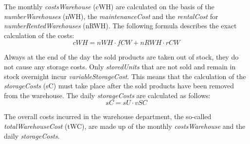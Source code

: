 The monthly \textit{costsWarehouse} (\gls{cWH}) are calculated on the basis of the \textit{numberWarehouses} (\gls{nWH}), the \textit{maintenanceCost} and the \textit{rentalCost} for \textit{numberRentedWarehouses} (\gls{nRWH}). The following formula describes the exact calculation of the costs:
\begin{equation}
\label{func:cWH} %
     cWH = nWH \cdot fCW + nRWH \cdot rCW
\end{equation}

Always at the end of the day the sold products are taken out of stock, they do not cause any storage costs. Only \textit{storedUnits} that are not sold and remain in stock overnight incur \textit{variableStorageCost}. This means that the calculation of the \textit{storageCosts} (\gls{sC}) must take place after the sold products have been removed from the warehouse. The daily \textit{storageCosts} are calculated as follows:
\begin{equation}
\label{func:SC} %
    sC = sU \cdot vSC
\end{equation}

The overall costs incurred in the warehouse department, the so-called \textit{totalWarehouseCost} (\gls{tWC}), are made up of the monthly \textit{costsWarehouse} and the daily \textit{storageCosts}. 